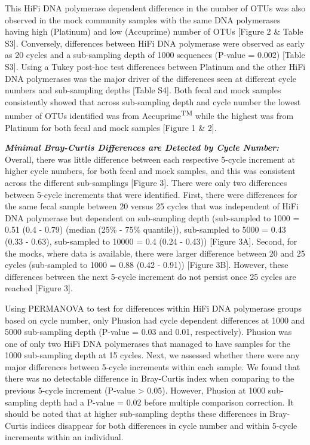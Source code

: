 \documentclass[12pt,]{article}
\begin{document}
This HiFi DNA polymerase dependent difference in the number of OTUs was
also observed in the mock community samples with the same DNA
polymerases having high (Platinum) and low (Accuprime) number of OTUs
{[}Figure 2 \& Table S3{]}. Conversely, differences between HiFi DNA
polymerase were observed as early as 20 cycles and a sub-sampling depth
of 1000 sequences (P-value = 0.002) {[}Table S3{]}. Using a Tukey
post-hoc test differences between Platinum and the other HiFi DNA
polymerases was the major driver of the differences seen at different
cycle numbers and sub-sampling depths {[}Table S4{]}. Both fecal and
mock samples consistently showed that across sub-sampling depth and
cycle number the lowest number of OTUs identified was from
Accuprime\textsuperscript{TM} while the highest was from Platinum for
both fecal and mock samples {[}Figure 1 \& 2{]}.

\textbf{\emph{Minimal Bray-Curtis Differences are Detected by Cycle
Number:}} Overall, there was little difference between each respective
5-cycle increment at higher cycle numbers, for both fecal and mock
samples, and this was consistent across the different sub-samplings
{[}Figure 3{]}. There were only two differences between 5-cycle
increments that were identified. First, there were differences for the
same fecal sample between 20 versus 25 cycles that was independent of
HiFi DNA polymerase but dependent on sub-sampling depth (sub-sampled to
1000 = 0.51 (0.4 - 0.79) (median (25\% - 75\% quantile)), sub-sampled to
5000 = 0.43 (0.33 - 0.63), sub-sampled to 10000 = 0.4 (0.24 - 0.43))
{[}Figure 3A{]}. Second, for the mocks, where data is available, there
were larger difference between 20 and 25 cycles (sub-sampled to 1000 =
0.88 (0.42 - 0.91)) {[}Figure 3B{]}. However, these differences between
the next 5-cycle increment do not persist once 25 cycles are reached
{[}Figure 3{]}.

Using PERMANOVA to test for differences within HiFi DNA polymerase
groups based on cycle number, only Phusion had cycle dependent
differences at 1000 and 5000 sub-sampling depth (P-value = 0.03 and
0.01, respectively). Phusion was one of only two HiFi DNA polymerases
that managed to have samples for the 1000 sub-sampling depth at 15
cycles. Next, we assessed whether there were any major differences
between 5-cycle increments within each sample. We found that there was
no detectable difference in Bray-Curtis index when comparing to the
previous 5-cycle increment (P-value \textgreater{} 0.05). However,
Phusion at 1000 sub-sampling depth had a P-value = 0.02 before multiple
comparison correction. It should be noted that at higher sub-sampling
depths these differences in Bray-Curtis indices disappear for both
differences in cycle number and within 5-cycle increments within an
individual.
\end{document}
